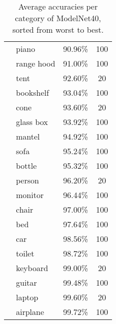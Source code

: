 \begin{table}[]
\begin{tabular}[t]{llcc}
	 &	piano             & 90.96\%           & 100            \\
	 &	range hood        & 91.00\%           & 100            \\
	 &	tent              & 92.60\%           & 20             \\
	 &	bookshelf         & 93.04\%           & 100            \\
	 &	cone              & 93.60\%           & 20             \\
	 &	glass box         & 93.92\%           & 100            \\
	 &	mantel            & 94.92\%           & 100            \\
	 &	sofa              & 95.24\%           & 100            \\
	 &	bottle            & 95.32\%           & 100            \\
	 &	person            & 96.20\%           & 20             \\
	 &	monitor           & 96.44\%           & 100            \\
	 &chair             & 97.00\%           & 100            \\
	 &	bed               & 97.64\%           & 100            \\
	 &	car               & 98.56\%           & 100            \\
	 &	toilet            & 98.72\%           & 100            \\
	 &	keyboard          & 99.00\%           & 20             \\
	 & 	guitar            & 99.48\%           & 100            \\
	 &	laptop            & 99.60\%           & 20             \\
	 &	airplane          & 99.72\%           & 100            \\ \hline
	\end{tabular}
	
	
	\caption{Average accuracies per category of ModelNet40, sorted from worst to best.}
	\label{Table:cataccuracies}
\end{table}
